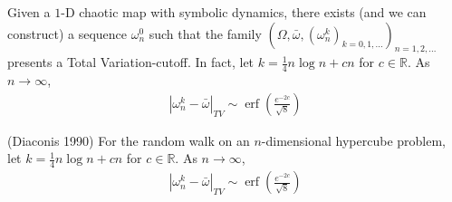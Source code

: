 \documentclass[12pt,t]{beamer}
\DeclareMathOperator{\erf}{erf} \DeclareMathOperator{\prob}{Prob}
\begin{document}
\begin{frame}
\begin{theorem}
Given a $1$-D chaotic map with symbolic dynamics, there exists (and we can construct) a sequence $\omega_n^0$ such that the family
$(\Omega,\bar{\omega},(\omega^k_n)_{k=0,1,...})_{n=1,2,...}$ presents a Total Variation-cutoff. In fact, let $k =
\frac{1}{4}n\log{n}+cn $ for $c\in \mathbb{R}$. As $n\rightarrow \infty$,
\begin{eqnarray*}
\label{erfbound}
       |\omega^k_n - \bar{\omega} |_{TV} \sim \erf \left(\frac{e^{-2c}}{\sqrt{8}}\right)
\end{eqnarray*}
\end{theorem}

 (Diaconis 1990) For the random walk on an $n$-dimensional hypercube problem, let $k = \frac{1}{4}n\log{n}+cn$ for $c \in \mathbb{R}$. As $n \rightarrow \infty$,
\begin{eqnarray*}
\label{rdwalkshape}
 |\omega^k_n - \bar{\omega} |_{TV} \sim \erf\left(\frac{e^{-2c}}{\sqrt{8}}\right)
\end{eqnarray*}
\end{frame}
\end{document}

